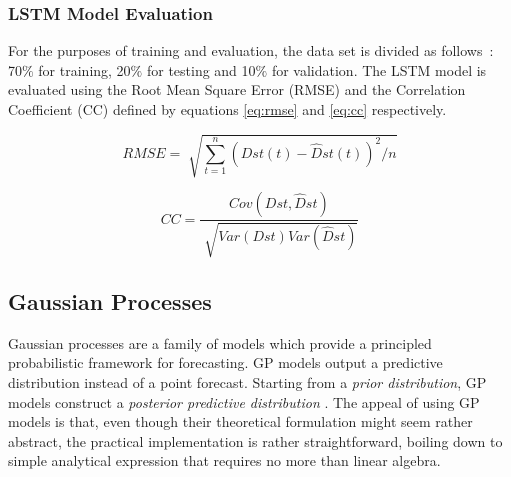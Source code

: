 \subsubsection*{LSTM Model Evaluation}

For the purposes of training and evaluation, the data set is divided as follows : 70$\%$ for training, 20$\%$  
for testing and 10$\%$ for validation. The LSTM model is evaluated using the Root Mean Square Error (RMSE) 
and the Correlation Coefficient (CC) defined by equations \ref{eq:rmse} and \ref{eq:cc} respectively. 


\begin{equation}\label{eq:rmse}
 RMSE = \sqrt[]{ \sum_{t=1}^{n} \left( Dst \left( t \right) - \hat{D}st \left( t \right)  \right) ^{2}/n}
\end{equation}

\begin{equation}\label{eq:cc}
 CC = \frac{Cov \left( Dst, \hat{D}st \right)}{\sqrt[]{Var \left( Dst \right) Var \left( \hat{D}st \right)}} 
\end{equation}


\subsection{Gaussian Processes}\label{sec:gpcomponent}




Gaussian processes are a family of models which provide a principled probabilistic framework for forecasting.
GP models output a predictive distribution instead of a point forecast. Starting from a \emph{prior distribution},
GP models construct a \emph{posterior predictive distribution} . The appeal of using GP models is that, even though 
their theoretical formulation might seem rather abstract, the practical implementation is rather straightforward, 
boiling down to simple analytical expression that requires no more than linear algebra. 

